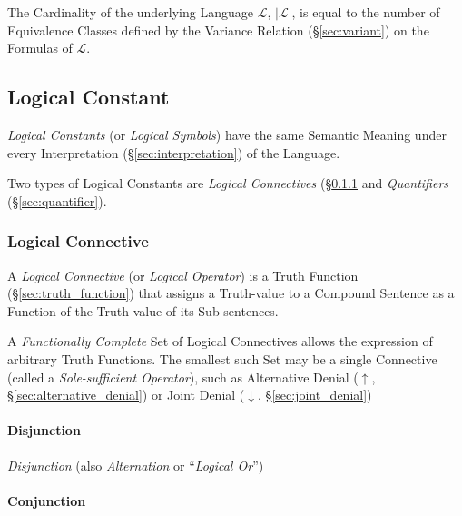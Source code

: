 The Cardinality of the underlying Language $\mathcal{L}$,
$|\mathcal{L}|$, is equal to the number of Equivalence Classes defined
by the Variance Relation (\S\ref{sec:variant}) on the Formulas of
$\mathcal{L}$.



\subsection{Logical Constant}\label{sec:logical_constant}

\emph{Logical Constants} (or \emph{Logical Symbols}) have the same
Semantic Meaning under every Interpretation
(\S\ref{sec:interpretation}) of the Language.

Two types of Logical Constants are \emph{Logical Connectives}
(\S\ref{sec:logical_connective} and \emph{Quantifiers}
(\S\ref{sec:quantifier}).



\subsubsection{Logical Connective}\label{sec:logical_connective}

A \emph{Logical Connective} (or \emph{Logical Operator}) is a Truth
Function (\S\ref{sec:truth_function}) that assigns a Truth-value to a
Compound Sentence as a Function of the Truth-value of its
Sub-sentences.

A \emph{Functionally Complete} Set of Logical Connectives allows the
expression of arbitrary Truth Functions. The smallest such Set may be
a single Connective (called a \emph{Sole-sufficient Operator}), such
as Alternative Denial ($\uparrow$, \S\ref{sec:alternative_denial}) or
Joint Denial ($\downarrow$, \S\ref{sec:joint_denial})



\paragraph{Disjunction}\label{sec:disjunction}\hfill

\emph{Disjunction} (also \emph{Alternation} or ``\emph{Logical Or}'')



\paragraph{Conjunction}\label{sec:conjunction}\hfill

